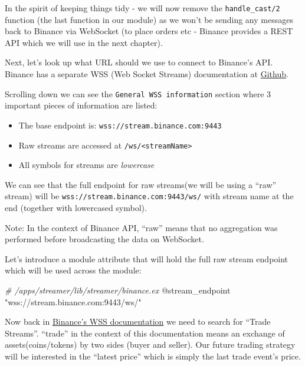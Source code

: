 \documentclass[
  oneside]{book}
\newenvironment{Shaded}{\begin{snugshade}}{\end{snugshade}}
\newcommand{\CommentTok}[1]{\textcolor[rgb]{0.56,0.35,0.01}{\textit{#1}}}
\newcommand{\OtherTok}[1]{\textcolor[rgb]{0.56,0.35,0.01}{#1}}
\newcommand{\StringTok}[1]{\textcolor[rgb]{0.31,0.60,0.02}{#1}}
\providecommand{\tightlist}{%
  \setlength{\itemsep}{0pt}\setlength{\parskip}{0pt}}
\begin{document}
In the spirit of keeping things tidy - we will now remove the \texttt{handle\_cast/2} function (the last function in our module) as we won't be sending any messages back to Binance via WebSocket (to place orders etc - Binance provides a REST API which we will use in the next chapter).

Next, let's look up what URL should we use to connect to Binance's API. Binance has a separate WSS (Web Socket Streams) documentation at \href{https://github.com/binance/binance-spot-api-docs/blob/master/web-socket-streams.md}{Github}.

Scrolling down we can see the \texttt{General\ WSS\ information} section where 3 important pieces of information are listed:

\begin{itemize}
\tightlist
\item
  The base endpoint is: \texttt{wss://stream.binance.com:9443}
\item
  Raw streams are accessed at \texttt{/ws/\textless{}streamName\textgreater{}}
\item
  All symbols for streams are \emph{lowercase}
\end{itemize}

We can see that the full endpoint for raw streams(we will be using a ``raw'' stream) will be \texttt{wss://stream.binance.com:9443/ws/} with stream name at the end (together with lowercased symbol).

Note: In the context of Binance API, ``raw'' means that no aggregation was performed before broadcasting the data on WebSocket.

Let's introduce a module attribute that will hold the full raw stream endpoint which will be used across the module:

\begin{Shaded}
\begin{Highlighting}[]
\CommentTok{\# /apps/streamer/lib/streamer/binance.ex}
\OtherTok{@stream\_endpoint} \StringTok{"wss://stream.binance.com:9443/ws/"}
\end{Highlighting}
\end{Shaded}

Now back in \href{https://github.com/binance/binance-spot-api-docs/blob/master/web-socket-streams.md}{Binance's WSS documentation} we need to search for ``Trade Streams''. ``trade'' in the context of this documentation means an exchange of assets(coins/tokens) by two sides (buyer and seller). Our future trading strategy will be interested in the ``latest price'' which is simply the last trade event's price.
\end{document}
